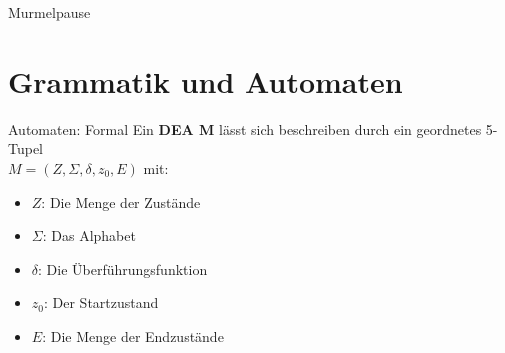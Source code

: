 



\begin{frame}[standout]
  Murmelpause
\end{frame}

\section{Grammatik und Automaten}

\begin{frame}{Automaten: Formal}
    Ein \textbf{DEA M} lässt sich beschreiben durch ein geordnetes 5-Tupel\\
    \alert{$M=(Z, \Sigma, \delta, z_0, E)$} mit:
    \begin{itemize}
        \item $Z$: Die Menge der Zustände
        \item $\Sigma$: Das Alphabet
        \item $\delta$: Die Überführungsfunktion
        \item $z_0$: Der Startzustand
        \item $E$: Die Menge der Endzustände
    \end{itemize}
\end{frame}


